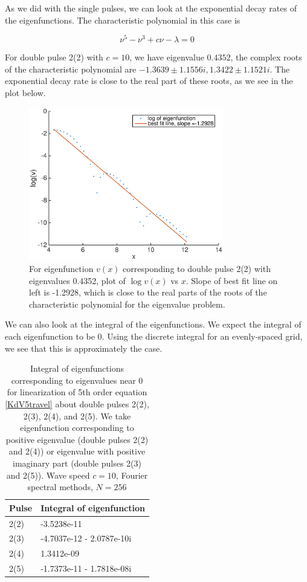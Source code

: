 \documentclass[12pt]{article}
\begin{document}
As we did with the single pulses, we can look at the exponential decay rates of the eigenfunctions. The characteristic polynomial in this case is 

\begin{equation} \label{charpoly2}
\nu^5 - \nu^3 + c \nu - \lambda = 0
\end{equation}

For double pulse 2(2) with $c = 10$, we have eigenvalue $0.4352$, the complex roots of the characteristic polynomial are $-1.3639 \pm 1.1556i, 1.3422 \pm 1.1521i$. The exponential decay rate is close to the real part of these roots, as we see in the plot below.

\begin{figure}[H]
	\includegraphics[width=8.5cm]{decayeigenfunction}
	\caption{For eigenfunction $v(x)$ corresponding to double pulse 2(2) with eigenvalues 0.4352, plot of $\log v(x)$ vs $x$. Slope of best fit line on left is -1.2928, which is close to the real parts of the roots of the characteristic polynomial for the eigenvalue problem.}
\end{figure}

We can also look at the integral of the eigenfunctions. We expect the integral of each eigenfunction to be 0. Using the discrete integral for an evenly-spaced grid, we see that this is approximately the case.

\begin{table}[H]
\begin{tabular}{l|l}
Pulse  & Integral of eigenfunction \\ \hline
2(2)   & -3.5238e-11   \\
2(3)   & -4.7037e-12 - 2.0787e-10i  \\
2(4)   & 1.3412e-09  \\
2(5)   & -1.7373e-11 - 1.7818e-08i  \\
\end{tabular}
\caption{Integral of eigenfunctions corresponding to eigenvalues near 0 for linearization of 5th order equation \eqref{KdV5travel} about double pulses 2(2), 2(3), 2(4), and 2(5). We take eigenfunction corresponding to positive eigenvalue (double pulses 2(2) and 2(4)) or eigenvalue with positive imaginary part (double pulses 2(3) and 2(5)). Wave speed $c = 10$, Fourier spectral methods, $N = 256$}
\end{table}
\end{document}
